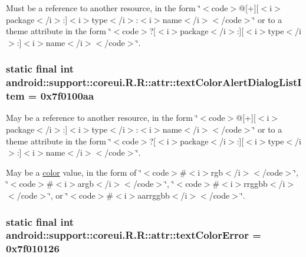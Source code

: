 Must be a reference to another resource, in the form \char`\"{}$<$code$>$@\mbox{[}+\mbox{]}\mbox{[}$<$i$>$package$<$/i$>$:\mbox{]}$<$i$>$type$<$/i$>$:$<$i$>$name$<$/i$>$$<$/code$>$\char`\"{} or to a theme attribute in the form \char`\"{}$<$code$>$?\mbox{[}$<$i$>$package$<$/i$>$:\mbox{]}\mbox{[}$<$i$>$type$<$/i$>$:\mbox{]}$<$i$>$name$<$/i$>$$<$/code$>$\char`\"{}. \hypertarget{classandroid_1_1support_1_1coreui_1_1_r_1_1attr_dd4cfbe6d7a5d37b1b61a542c4af0928}{
\subsubsection[{textColorAlertDialogListItem}]{\setlength{\rightskip}{0pt plus 5cm}static final int android::support::coreui.R.R::attr::textColorAlertDialogListItem = 0x7f0100aa}}
\label{classandroid_1_1support_1_1coreui_1_1_r_1_1attr_dd4cfbe6d7a5d37b1b61a542c4af0928}


May be a reference to another resource, in the form \char`\"{}$<$code$>$@\mbox{[}+\mbox{]}\mbox{[}$<$i$>$package$<$/i$>$:\mbox{]}$<$i$>$type$<$/i$>$:$<$i$>$name$<$/i$>$$<$/code$>$\char`\"{} or to a theme attribute in the form \char`\"{}$<$code$>$?\mbox{[}$<$i$>$package$<$/i$>$:\mbox{]}\mbox{[}$<$i$>$type$<$/i$>$:\mbox{]}$<$i$>$name$<$/i$>$$<$/code$>$\char`\"{}. 

May be a \hyperlink{classandroid_1_1support_1_1coreui_1_1_r_1_1color}{color} value, in the form of \char`\"{}$<$code$>$\#$<$i$>$rgb$<$/i$>$$<$/code$>$\char`\"{}, \char`\"{}$<$code$>$\#$<$i$>$argb$<$/i$>$$<$/code$>$\char`\"{}, \char`\"{}$<$code$>$\#$<$i$>$rrggbb$<$/i$>$$<$/code$>$\char`\"{}, or \char`\"{}$<$code$>$\#$<$i$>$aarrggbb$<$/i$>$$<$/code$>$\char`\"{}. \hypertarget{classandroid_1_1support_1_1coreui_1_1_r_1_1attr_ac49e407240dd558a5edb56d9c1c9281}{
\subsubsection[{textColorError}]{\setlength{\rightskip}{0pt plus 5cm}static final int android::support::coreui.R.R::attr::textColorError = 0x7f010126}}
\label{classandroid_1_1support_1_1coreui_1_1_r_1_1attr_ac49e407240dd558a5edb56d9c1c9281}


